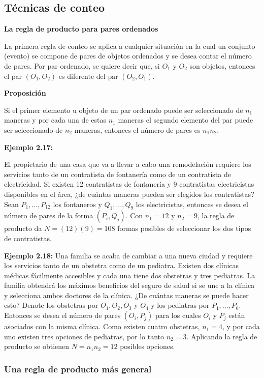 \documentclass[a4paper]{article}
\begin{document}
\subsection{Técnicas de conteo}

\textbf{La regla de producto para pares ordenados}

La primera regla de conteo se aplica a cualquier situación en la cual un conjunto (evento) se compone de pares de objetos ordenados y se desea contar el número de pares. Por par ordenado, se quiere decir que, si $O_1$ y $O_2$ son objetos, entonces el par $(O_1, O_2)$ es diferente del par $(O_2, O_1)$.

\textbf{Proposición}

Si el primer elemento u objeto de un par ordenado puede ser seleccionado de $n_1$ maneras y por cada una de estas $n_1$ maneras el segundo elemento del par puede ser seleccionado de $n_2$ maneras, entonces el número de pares es $n_1n_2$.

\textbf{Ejemplo 2.17:}

El propietario de una casa que va a llevar a cabo una remodelación requiere los servicios tanto de un contratista de fontanería como de un contratista de electricidad. Si existen 12 contratistas de fontanería y 9 contratistas electricistas disponibles en el área, ¿de cuántas maneras pueden ser elegidos los contratistas? Sean $P_1, \dots, P_{12}$ los fontaneros y $Q_1, \dots, Q_9$ los electricistas, entonces se desea el número de pares de la forma $(P_i, Q_j)$. Con $n_1 = 12$ y $n_2 = 9$, la regla de producto da $N = (12)(9) = 108$ formas posibles de seleccionar los dos tipos de contratistas.

\textbf{Ejemplo 2.18:}
Una familia se acaba de cambiar a una nueva ciudad y requiere los servicios tanto de un obstetra como de un pediatra. Existen dos clínicas médicas fácilmente accesibles y cada una tiene dos obstetras y tres pediatras. La familia obtendrá los máximos beneficios del seguro de salud si se une a la clínica y selecciona ambos doctores de la clínica. ¿De cuántas maneras se puede hacer esto? Denote los obstetras por $O_1, O_2, O_3$ y $O_4$ y los pediatras por $P_1, \dots, P_6$. Entonces se desea el número de pares $(O_i, P_j)$ para los cuales $O_i$ y $P_j$ están asociados con la misma clínica. Como existen cuatro obstetras, $n_1 = 4$, y por cada uno existen tres opciones de pediatras, por lo tanto $n_2 = 3$. Aplicando la regla de producto se obtienen $N = n_1n_2 = 12$ posibles opciones.

\subsubsection{Una regla de producto más general}
\end{document}
